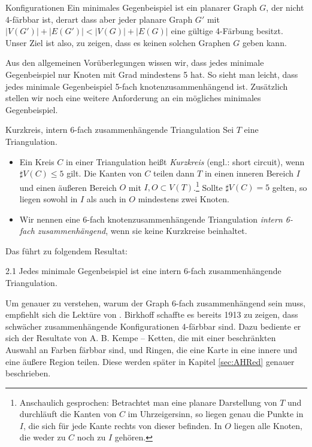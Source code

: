 \begin{section}{Konfigurationen}
 Ein minimales Gegenbeispiel ist ein planarer Graph $G$, der nicht 4-färbbar ist, derart dass aber jeder planare Graph $G'$ mit $|V(G')| + |E(G')| < |V(G)| + |E(G)|$ eine gültige 4-Färbung besitzt. Unser Ziel ist also, zu zeigen, dass es keinen solchen Graphen $G$ geben kann. 
   
 Aus den allgemeinen Vorüberlegungen wissen wir, dass jedes minimale Gegenbeispiel nur Knoten mit Grad mindestens 5 hat. So sieht man leicht, dass jedes minimale Gegenbeispiel 5-fach knotenzusammenhängend ist. Zusätzlich stellen wir noch eine weitere Anforderung an ein mögliches minimales Gegenbeispiel.
 \begin{definition}{Kurzkreis, intern 6-fach zusammenhängende Triangulation}
  Sei $T$ eine Triangulation.
  \begin{itemize}
   \item Ein Kreis $C$ in einer Triangulation heißt \textit{Kurzkreis} (engl.: short circuit), wenn $\sharp V(C) \leq 5$ gilt. Die Kanten von $C$ teilen dann $T$ in einen inneren Bereich $I$ und einen äußeren Bereich $O$ mit $I,O \subset V(T)$.\footnote{Anschaulich gesprochen: Betrachtet man eine planare Darstellung von $T$ und durchläuft die Kanten von $C$ im Uhrzeigersinn, so liegen genau die Punkte in $I$, die sich für jede Kante rechts von dieser befinden. In $O$ liegen alle Knoten, die weder zu $C$ noch zu $I$ gehören.} Sollte $\sharp V(C) = 5$ gelten, so liegen sowohl in $I$ als auch in $O$ mindestens zwei Knoten. 
   \item Wir nennen eine 6-fach knotenzusammenhängende Triangulation \textit{intern 6-fach zusammenhängend}, wenn sie keine Kurzkreise beinhaltet.
  \end{itemize}
 \end{definition}

  Das führt zu folgendem Resultat:
  
 \begin{satzl}{}{2.1}
  Jedes minimale Gegenbeispiel ist eine intern 6-fach zusammenhängende Triangulation. 
 \end{satzl}

 Um genauer zu verstehen, warum der Graph 6-fach zusammenhängend sein muss, empfiehlt sich die Lektüre von \cite{AmJMath35}. Birkhoff schaffte es bereits 1913 zu zeigen, dass schwächer zusammenhängende Konfigurationen 4-färbbar sind. Dazu bediente er sich der Resultate von A. B. Kempe -- Ketten, die mit einer beschränkten Auswahl an Farben färbbar sind, und Ringen, die eine Karte in eine innere und eine äußere Region teilen. Diese werden später in Kapitel \ref{sec:AHRed} genauer beschrieben.
 

\end{section}
